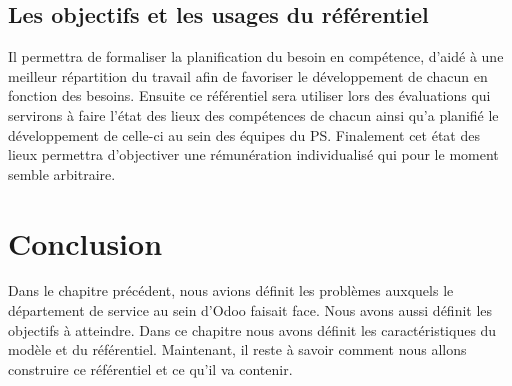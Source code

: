 \subsection{Les objectifs et les usages du référentiel}
Il permettra de formaliser la planification du besoin en compétence, d'aidé à une meilleur répartition du travail afin de favoriser le développement de chacun en fonction des besoins. Ensuite ce référentiel sera utiliser lors des évaluations qui servirons à faire l'état des lieux des compétences de chacun ainsi qu'a planifié le développement de celle-ci au sein des équipes du PS. Finalement cet état des lieux permettra d'objectiver une rémunération individualisé qui pour le moment semble arbitraire.



\section{Conclusion}
Dans le chapitre précédent, nous avions définit les problèmes auxquels le département de service au sein d'Odoo faisait face. Nous avons aussi définit les objectifs à atteindre. Dans ce chapitre nous avons définit les caractéristiques du modèle et du référentiel. Maintenant, il reste à savoir comment nous allons construire ce référentiel et ce qu'il va contenir.
 










 

